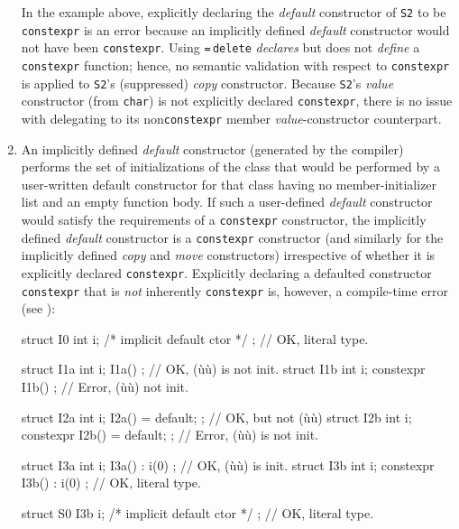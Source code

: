 \begin{enumerate}
{\noindent In the example above, explicitly declaring the \emph{default}
constructor of \lstinline!S2! to be \lstinline!constexpr! is an error because
an implicitly defined \emph{default} constructor would not have been
\lstinline!constexpr!. Using \lstinline!=!\,\lstinline!delete! \emph{declares} but
does not \emph{define} a \lstinline!constexpr! function; hence, no semantic
validation with respect to \lstinline!constexpr! is applied to
\lstinline!S2!'s (suppressed) \emph{copy} constructor. Because
\lstinline!S2!'s \emph{value} constructor (from \lstinline!char!) is not
explicitly declared \lstinline!constexpr!, there is no issue with
delegating to its non\lstinline!constexpr! member \emph{value}-constructor
counterpart.}

\item{An implicitly defined \emph{default} constructor (generated by the compiler) performs the set of initializations of the class that would be performed by a user-written default constructor for that class having no member-initializer list and an empty function body. If such a user-defined \emph{default} constructor would satisfy the requirements of a \lstinline!constexpr! constructor, the implicitly defined \emph{default} constructor is a \lstinline!constexpr! constructor (and similarly for the implicitly defined \emph{copy} and \emph{move} constructors) irrespective of whether it is explicitly declared \lstinline!constexpr!. Explicitly declaring a defaulted constructor \lstinline!constexpr! that is \emph{not} inherently \lstinline!constexpr! is, however, a compile-time error (see ):

\begin{emcppslisting} %
struct I0  { int i; /* implicit default ctor */ };  // OK, literal type.

struct I1a { int i;            I1a()        { } };  // OK, (ù{}ù) is not init.
struct I1b { int i;  constexpr I1b()        { } };  // Error, (ù{}ù) not init.

struct I2a { int i;            I2a() = default; };  // OK, but not (ù{}ù)
struct I2b { int i;  constexpr I2b() = default; };  // Error, (ù{}ù) is not init.

struct I3a { int i;            I3a() : i(0) { } };  // OK, (ù{}ù) is init.
struct I3b { int i;  constexpr I3b() : i(0) { } };  // OK, literal type.

struct S0  { I3b i; /* implicit default ctor */ };  // OK, literal type.


\end{emcppslisting}}
\end{enumerate}
